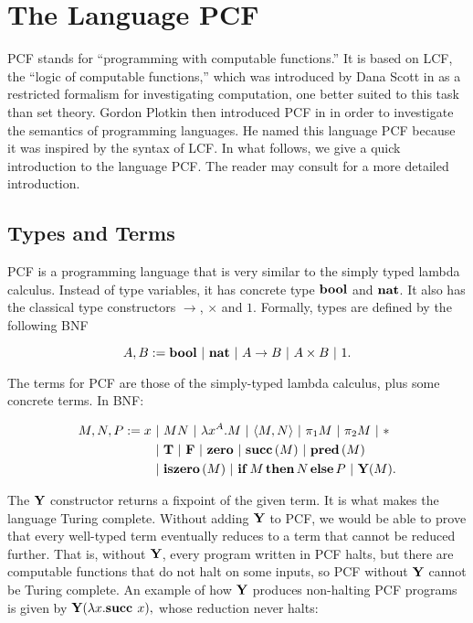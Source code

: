 
\section{The Language PCF}

PCF stands for ``programming with computable functions.'' It is based on LCF, the ``logic of computable functions,'' which was introduced by Dana Scott in \cite{LCF} as a restricted formalism for investigating computation, one better suited to this task than set theory. Gordon Plotkin then introduced PCF in \cite{PCF} in order to investigate the semantics of programming languages. He named this language PCF because it was inspired by the syntax of LCF. In what follows, we give a quick introduction to the language PCF. The reader may consult \cite{LambdaNotes} for a more detailed introduction.

\subsection{Types and Terms}

PCF is a programming language that is very similar to the simply typed lambda calculus. Instead of type variables, it has concrete type $\mathbf{bool}$ and $\mathbf{nat}$. It also has the classical type constructors $\to$, $\times$ and $1$. Formally, types are defined by the following BNF

\[ A, B := \mathbf{bool} \ \mathbf{|}\  \mathbf{nat} \ \mathbf{|}\  A\to B \ \mathbf{|}\  A\times B \ \mathbf{|}\  1. \]

The terms for PCF are those of the simply-typed lambda calculus, plus some concrete terms. In BNF:

\begin{align*}
    M, N, P := x &\ \mathbf{|}\  MN \ \mathbf{|}\  \lambda x^A.M \ \mathbf{|}\  \langle M, N\rangle \ \mathbf{|}\  \pi_1M \ \mathbf{|}\  \pi_2M \ \mathbf{|}\  * \\
    &\ \mathbf{|}\  \mathbf{T} \ \mathbf{|}\  \mathbf{F} \ \mathbf{|}\  \mathbf{zero} \ \mathbf{|}\  \mathbf{succ}\,(M) \ \mathbf{|}\  \mathbf{pred}\,(M) \\
    &\ \mathbf{|}\  \mathbf{iszero}\,(M) \ \mathbf{|}\  \mathbf{if}\,M\,\mathbf{then}\,N\,\mathbf{else}\,P \ \mathbf{|}\  \mathbf{Y}(M).
\end{align*}

The $\mathbf{Y}$ constructor returns a fixpoint of the given term. It is what makes the language Turing complete. Without adding $\textbf{Y}$ to PCF, we would be able to prove that every well-typed term eventually reduces to a term that cannot be reduced further. That is, without $\textbf{Y}$, every program written in PCF halts, but there are computable functions that do not halt on some inputs, so PCF without $\textbf{Y}$ cannot be Turing complete. An example of how $\textbf{Y}$ produces non-halting PCF programs is given by $\textbf{Y}(\lambda x. \textbf{succ } x),$ whose reduction never halts:

